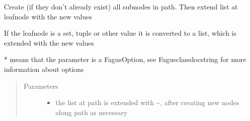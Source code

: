 \documentclass[a4paper,10pt,english]{sphinxmanual}
\begin{document}
\begin{fulllineitems}
\begin{fulllineitems}
\label{\detokenize{fagus.fagus:fagus.fagus.Fagus.extend}}
\pysigstartsignatures
{}
\pysigstopsignatures
\sphinxAtStartPar
Create (if they don’t already exist) all sub\sphinxhyphen{}nodes in path. Then extend list at leaf\sphinxhyphen{}node with the new values

\sphinxAtStartPar
If the leaf\sphinxhyphen{}node is a set, tuple or other value it is converted to a list, which is extended with the new values

\sphinxAtStartPar
* means that the parameter is a FagusOption, see Fagus\sphinxhyphen{}class\sphinxhyphen{}docstring for more information about options
\begin{quote}\begin{description}
\item[{Parameters}] \leavevmode\begin{itemize}
\item {}
\sphinxAtStartPar
{} \textendash{} the list at path is extended with \textasciitilde{}, after creating new nodes along path as necessary


\end{itemize}
\end{description}
\end{quote}
\end{fulllineitems}
\end{fulllineitems}
\end{document}
